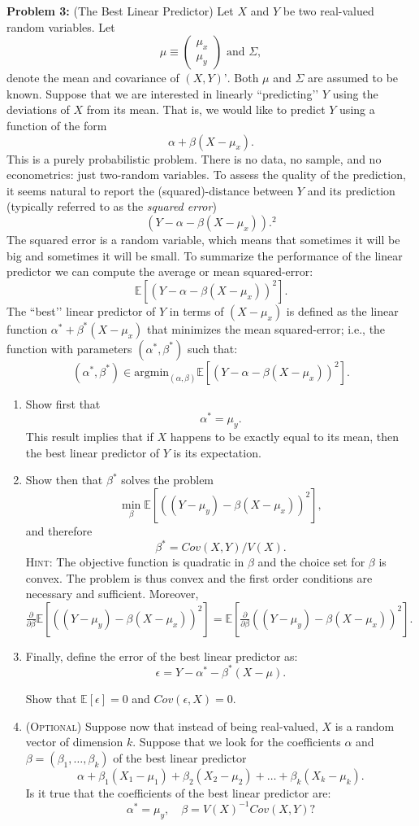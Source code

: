 \documentclass[11pt]{article} %
\begin{document}
\noindent \textbf{Problem 3:} (The Best Linear Predictor) Let $X$ and $Y$ be two real-valued random variables. Let
\[\mu \equiv \begin{pmatrix} \mu_x \\ \mu_y \end{pmatrix} \textrm{ and } \Sigma, \]
denote the mean and covariance of $(X,Y)’$. Both $\mu$ and $\Sigma$ are assumed to be known. Suppose that we are interested in linearly ``predicting’’ $Y$ using the deviations of $X$ from its mean. That is, we would like to predict $Y$ using a function of the form
\[ \alpha + \beta (X-\mu_x). \]
This is a purely probabilistic problem. There is no data, no sample, and no econometrics: just two-random variables. To assess the quality of the prediction, it seems natural to report the (squared)-distance between $Y$ and its prediction (typically referred to as the \emph{squared error})
\[ (Y - \alpha -\beta (X-\mu_x)).^2 \]
The squared error is a random variable, which means that sometimes it will be big and sometimes it will be small. To summarize the performance of the linear predictor we can compute the average or mean squared-error:
\[ \mathbb{E}[(Y - \alpha -\beta (X-\mu_x))^2]. \]   
The ``best’’ linear predictor of $Y$ in terms of $(X-\mu_x)$ is defined as the linear function $\alpha^* + \beta^* (X-\mu_x)$ that minimizes the mean squared-error; i.e., the function with parameters $(\alpha^*,\beta^*)$ such that:
\[ (\alpha^*,\beta^*) \in \textrm{argmin}_{(\alpha,\beta)} \mathbb{E}[(Y-\alpha-\beta (X-\mu_x))^2].  \]
\begin{enumerate}
\item Show first that 
\[ \alpha^* = \mu_y. \]
This result implies that if $X$ happens to be exactly equal to its mean, then the best linear predictor of $Y$ is its expectation. 
\item Show then that $\beta^*$ solves the problem
\[ \min_{\beta} \mathbb{E}[ ((Y-\mu_y) - \beta (X-\mu_x))^2 ], \]
and therefore 
\[ \beta^*  = Cov(X,Y) / V(X). \]
{\scshape Hint:} The objective function is quadratic in $\beta$ and the choice set for $\beta$ is convex. The problem is thus convex and the first order conditions are necessary and sufficient. Moreover, $\frac{\partial}{\partial \beta}\mathbb{E}[ ((Y-\mu_y) - \beta (X-\mu_x))^2 ] = \mathbb{E}[  \frac{\partial}{\partial \beta}((Y-\mu_y) - \beta (X-\mu_x))^2 ]$.

\item Finally, define the error of the best linear predictor as:
\[ \epsilon = Y - \alpha^* - \beta^*(X-\mu).\]

Show that $\mathbb{E}[\epsilon]=0$ and $Cov(\epsilon,X) = 0$. 


\item ({\scshape Optional}) Suppose now that instead of being real-valued, $X$ is a random vector of dimension $k$. Suppose that we look for the coefficients $\alpha$ and $\beta = (\beta_1, \ldots, \beta_k)$ of the best linear predictor
\[ \alpha + \beta_1 ( X_1 -\mu_{1} ) + \beta_2 (X_2- \mu_2) + \ldots + \beta_{k} (X_k - \mu_k). \]
Is it true that the coefficients of the best linear predictor are:
\[ \alpha^* = \mu_y, \quad \beta = V(X)^{-1} Cov(X,Y) ? \]
\end{enumerate}
 
\end{document}
